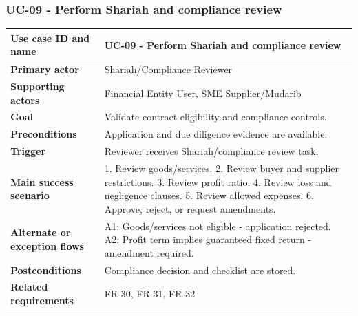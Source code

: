\documentclass[11pt,a4paper]{article}
\begin{document}
\subsubsection{UC-09 - Perform Shariah and compliance review}
\begin{footnotesize}
\begin{longtable}{@{}p{}p{}@{}}
\rowcolor{gray!10}\textbf{Use case ID and name} & UC-09 - Perform Shariah and compliance review \\ \hline
\rowcolor{gray!10}\textbf{Primary actor} & Shariah/Compliance Reviewer \\ \hline
\rowcolor{gray!10}\textbf{Supporting actors} & Financial Entity User, SME Supplier/Mudarib \\ \hline
\rowcolor{gray!10}\textbf{Goal} & Validate contract eligibility and compliance controls. \\ \hline
\rowcolor{gray!10}\textbf{Preconditions} & Application and due diligence evidence are available. \\ \hline
\rowcolor{gray!10}\textbf{Trigger} & Reviewer receives Shariah/compliance review task. \\ \hline
\rowcolor{gray!10}\textbf{Main success scenario} & 1. Review goods/services. 2. Review buyer and supplier restrictions. 3. Review profit ratio. 4. Review loss and negligence clauses. 5. Review allowed expenses. 6. Approve, reject, or request amendments. \\ \hline
\rowcolor{gray!10}\textbf{Alternate or exception flows} & A1: Goods/services not eligible - application rejected. A2: Profit term implies guaranteed fixed return - amendment required. \\ \hline
\rowcolor{gray!10}\textbf{Postconditions} & Compliance decision and checklist are stored. \\ \hline
\rowcolor{gray!10}\textbf{Related requirements} & FR-30, FR-31, FR-32 \\ \hline
\end{longtable}
\end{footnotesize}
\end{document}
